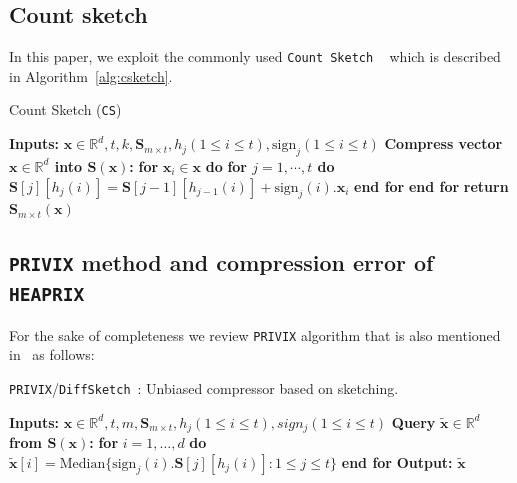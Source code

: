 \documentclass[11pt]{article}
\begin{document}
\subsection{Count sketch}
 In this paper, we exploit the commonly used \texttt{Count Sketch} ~\citep{DBLP:journals/tcs/CharikarCF04} which is described in Algorithm~\ref{alg:csketch}.
 \begin{algorithm}[H]
\caption{Count Sketch ({\texttt{CS})~\citep{DBLP:journals/tcs/CharikarCF04}} }\label{alg:csketch}
 \begin{algorithmic}[1]
\STATE \textbf{Inputs:} $\boldsymbol{x}\in\mathbb{R}^{d}, t, k, \mathbf{S}_{m\times t}, h_j (1\leq i\leq t), \text{sign}_j (1\leq i\leq t)$
 \STATE \textbf{Compress vector $\boldsymbol{x}\in\mathbb{R}^{d}$ into $\mathbf{S}\left(\boldsymbol{x}\right)$:}
 \STATE \textbf{for} $\boldsymbol{x}_i\in\boldsymbol{x}$ \textbf{do}
 \STATE \quad\textbf{for $j=1,\cdots,t$ do}
 \STATE \quad\quad $\mathbf{S}[j][h_j(i)]=\mathbf{S}[j-1][h_{j-1}(i)]+\text{sign}_j(i).\boldsymbol{x}_i$ 
 \STATE \quad\textbf{end for}
 \STATE \textbf{end for}
 \STATE \textbf{return} $\mathbf{S}_{m\times t}(\boldsymbol{x})$
 \end{algorithmic}
 \end{algorithm}

\subsection{\texttt{PRIVIX} method and compression error of \texttt{HEAPRIX}}
For the sake of completeness we review \texttt{PRIVIX} algorithm that is also mentioned in~\cite{li2019privacy} as follows:

\begin{algorithm}[H]
\caption{\texttt{PRIVIX}/\texttt{DiffSketch}~\citep{li2019privacy}: Unbiased compressor based on sketching. }\label{Alg:privix}
\begin{algorithmic}[1]
\STATE \textbf{Inputs:} $\boldsymbol{x}\in\mathbb{R}^{d}, t, m, \mathbf{S}_{m\times t}, h_j (1\leq i\leq t), sign_j (1\leq i\leq t)$
\STATE \textbf{Query} $\tilde{\boldsymbol{x}}\in\mathbb{R}^d$ \textbf{from $\mathbf{S(\boldsymbol{x})}$:}
\STATE \textbf{for} $i=1,\ldots,d$ \textbf{do}
\STATE \quad\quad ${\tilde{\boldsymbol{x}}}[i]=\text{Median}\{\text{sign}_j(i).\mathbf{S}[j][h_j(i)]:1\leq j\leq t\}$ 
\STATE \textbf{end for}
\STATE \textbf{Output:} ${\tilde{\boldsymbol{x}}}$
\end{algorithmic}
\end{algorithm}
\end{document}
